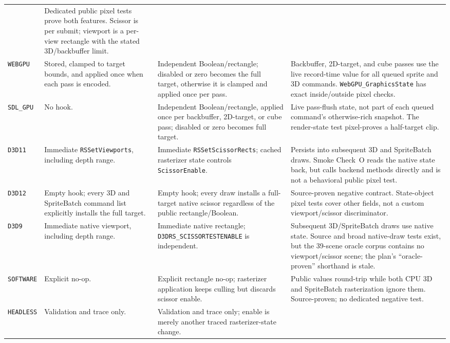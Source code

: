 \begin{longtable}{@{}p{}p{}p{}p{}@{}}
  & Dedicated public pixel tests prove both features. Scissor is per submit; viewport is a
    per-view rectangle with the stated 3D/backbuffer limit. \\
\texttt{WEBGPU}
  & Stored, clamped to target bounds, and applied once when each pass is encoded.
  & Independent Boolean/rectangle; disabled or zero becomes the full target, otherwise it is
    clamped and applied once per pass.
  & Backbuffer, 2D-target, and cube passes use the live record-time value for all queued sprite
    and 3D commands. \texttt{WebGPU\_GraphicsState} has exact inside/outside pixel checks. \\
\texttt{SDL\_GPU}
  & No hook.
  & Independent Boolean/rectangle, applied once per backbuffer, 2D-target, or cube pass; disabled
    or zero becomes full target.
  & Live pass-flush state, not part of each queued command's otherwise-rich snapshot. The
    render-state test pixel-proves a half-target clip. \\
\texttt{D3D11}
  & Immediate \texttt{RSSetViewports}, including depth range.
  & Immediate \texttt{RSSetScissorRects}; cached rasterizer state controls
    \texttt{ScissorEnable}.
  & Persists into subsequent 3D and SpriteBatch draws. Smoke Check~O reads the native state back,
    but calls backend methods directly and is not a behavioral public pixel test. \\
\texttt{D3D12}
  & Empty hook; every 3D and SpriteBatch command list explicitly installs the full target.
  & Empty hook; every draw installs a full-target native scissor regardless of the public
    rectangle/Boolean.
  & Source-proven negative contract. State-object pixel tests cover other fields, not a custom
    viewport/scissor discriminator. \\
\texttt{D3D9}
  & Immediate native viewport, including depth range.
  & Immediate native rectangle; \texttt{D3DRS\_SCISSORTESTENABLE} is independent.
  & Subsequent 3D/SpriteBatch draws use native state. Source and broad native-draw tests exist,
    but the 39-scene oracle corpus contains no viewport/scissor scene; the plan's
    ``oracle-proven'' shorthand is stale. \\
\texttt{SOFTWARE}
  & Explicit no-op.
  & Explicit rectangle no-op; rasterizer application keeps culling but discards scissor enable.
  & Public values round-trip while both CPU 3D and SpriteBatch rasterization ignore them.
    Source-proven; no dedicated negative test. \\
\texttt{HEADLESS}
  & Validation and trace only.
  & Validation and trace only; enable is merely another traced rasterizer-state change.

\end{longtable}
